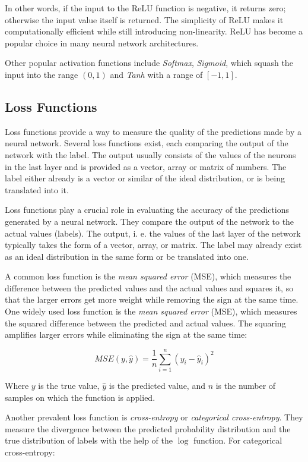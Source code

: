 \documentclass[12pt, a4paper, titlepage]{report}
\begin{document}
In other words, if the input to the ReLU function is negative, it returns zero; otherwise the input value itself is returned. The simplicity of ReLU makes it computationally efficient while still introducing non-linearity. ReLU has become a popular choice in many neural network architectures.

\vspace{0.5cm}
Other popular activation functions include \emph{Softmax}, \emph{Sigmoid}, which squash the input into the range $(0, 1)$ and \emph{Tanh} with a range of $[-1, 1]$.


\subsection{Loss Functions}

Loss functions provide a way to measure the quality of the predictions made by a neural network. Several loss functions exist, each comparing the output of the network with the label. The output usually consists of the values of the neurons in the last layer and is provided as a vector, array or matrix of numbers. The label either already is a vector or similar of the ideal distribution, or is being translated into it.

Loss functions play a crucial role in evaluating the accuracy of the predictions generated by a neural network. They compare the output of the network to the actual values (labels). The output, i. e. the values of the last layer of the network typically takes the form of a vector, array, or matrix. The label may already exist as an ideal distribution in the same form or be translated into one.


A common loss function is the \emph{mean squared error} (MSE), which measures the difference between the predicted values and the actual values and squares it, so that the larger errors get more weight while removing the sign at the same time.
One widely used loss function is the \emph{mean squared error} (MSE), which measures the squared difference between the predicted and actual values. The squaring amplifies larger errors while eliminating the sign at the same time:

\[
   MSE(y, \hat{y}) = \frac{1}{n} \sum_{i=1}^{n} (y_i - \hat{y}_i)^2
\]

Where $y$ is the true value, $\hat{y}$ is the predicted value, and $n$ is the number of samples on which the function is applied.


Another prevalent loss function is \emph{cross-entropy} or \emph{categorical cross-entropy}. They measure the divergence between the predicted probability distribution and the true distribution of labels with the help of the $\log$ function. For categorical cross-entropy:
\end{document}

